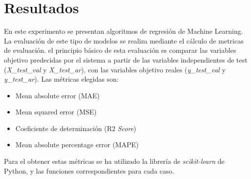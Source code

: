 \documentclass[12pt,a4paper,Spanish]{article}
\begin{document}
\newpage
\section{Resultados}\label{resultados}
En este experimento se presentan algoritmos de regresión de Machine Learning. La evaluación de este tipo de modelos se realiza mediante el cálculo de metricas de evaluación. el principio básico de esta evaluación es comparar las variables objetivo predecidas por el sistema a partir de las variables independientes de test (\textit{X\_test\_val} y \textit{X\_test\_ar}), con las variables objetivo reales (\textit{y\_test\_val} y \textit{y\_test\_ar}). Las métricas elegidas son:
\begin{itemize}
	\item Mean absolute error (MAE)
	\item Mean squared error (MSE)
	\item Coeficiente de determinación (R2 \textit{Score})
	\item Mean absolute percentage error (MAPE)
\end{itemize}
Para el obtener estas métricas se ha utilizado la librería de \textit{scikit-learn} de Python, y las funciones correspondientes para cada caso.
\end{document}
